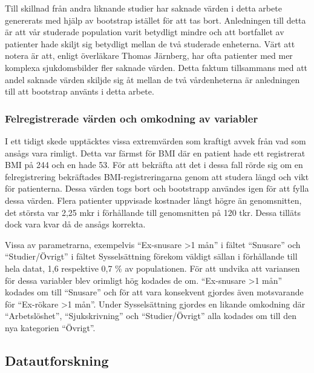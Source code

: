Till skillnad från andra liknande studier har saknade värden i detta arbete genererats med hjälp av bootstrap istället för att tas bort. Anledningen till detta är att vår studerade population varit betydligt mindre och att bortfallet av patienter hade skiljt sig betydligt mellan de två studerade enheterna. Värt att notera är att, enligt överläkare Thomas Järnberg,  har ofta patienter med mer komplexa sjukdomsbilder fler saknade värden. Detta faktum tillsammans med att andel saknade värden skiljde sig åt mellan de två vårdenheterna är anledningen till att bootstrap använts i detta arbete.

\subsubsection{Felregistrerade värden och omkodning av variabler}
I ett tidigt skede upptäcktes vissa extremvärden som kraftigt avvek från vad som ansågs vara rimligt. Detta var färmst för BMI där en patient hade ett registrerat BMI på 244 och en hade 53. För att bekräfta att det i dessa fall rörde sig om en felregistrering bekräftades BMI-registreringarna genom att studera längd och vikt för patienterna. Dessa värden togs bort och bootstrapp användes igen för att fylla dessa värden. Flera patienter uppvisade kostnader långt högre än genomsnitten, det största var 2,25 mkr i förhållande till genomsnitten på 120 tkr. Dessa tilläts dock vara kvar då de ansågs korrekta.

Vissa av parametrarna, exempelvis “Ex-snusare \textgreater1 mån” i fältet “Snusare” och “Studier/Övrigt” i fältet Sysselsättning förekom väldigt sällan i förhållande till hela datat, 1,6 respektive 0,7 \% av populationen. För att undvika att variansen för dessa variabler blev orimligt hög kodades de om. “Ex-snusare \textgreater1 mån” kodades om till “Snusare” och för att vara konsekvent gjordes även motsvarande för “Ex-rökare \textgreater1 mån”. Under Sysselsättning gjordes en likande omkodning där “Arbetslöshet”, “Sjukskrivning” och “Studier/Övrigt” alla kodades om till den nya kategorien “Övrigt”.

\subsection{Datautforskning}

